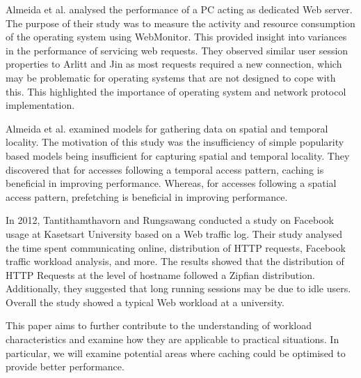 \documentclass[10pt,conference]{IEEEtran}
\begin{document}
Almeida et al. \cite{almeida} analysed the performance of a PC acting as dedicated Web server. The purpose of their study was to measure the activity and resource consumption of the operating system using WebMonitor. This provided insight into variances in the performance of servicing web requests. They observed similar user session properties to Arlitt and Jin \cite{world_cup} as most requests required a new connection, which may be problematic for operating systems that are not designed to cope with this. This highlighted the importance of operating system and network protocol implementation.

Almeida et al. \cite{reference_locality} examined models for gathering data on spatial and temporal locality. The motivation of this study was the insufficiency of simple popularity based models being insufficient for capturing spatial and temporal locality. They discovered that for accesses following a temporal access pattern, caching is beneficial in improving performance. Whereas, for accesses following a spatial access pattern, prefetching is beneficial in improving performance.

In 2012, Tantithamthavorn and Rungsawang \cite{facebook} conducted a study on Facebook usage at Kasetsart University based on a Web traffic log. Their study analysed the time spent communicating online, distribution of HTTP requests, Facebook traffic workload analysis, and more. The results showed that the distribution of HTTP Requests at the level of hostname followed a Zipfian distribution. Additionally, they suggested that long running sessions may be due to idle users. Overall the study showed a typical Web workload at a university.

This paper aims to further contribute to the understanding of workload characteristics and examine how they are applicable to practical situations. In particular, we will examine potential areas where caching could be optimised to provide better performance.
\end{document}
